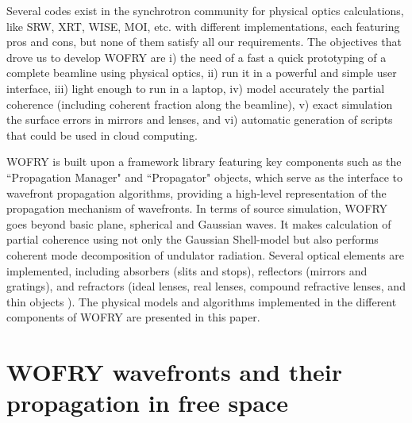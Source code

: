 \documentclass{iopconfser}
\begin{document}
Several codes exist in the synchrotron community for physical optics calculations, like SRW\cite{codeSRW}, XRT\cite{XRT}, WISE\cite{wise}, MOI\cite{MOI}, etc. with different implementations, each featuring pros and cons, but none of them satisfy all our requirements. The objectives that drove us to develop WOFRY are i) the need of a fast a quick prototyping of a complete beamline using physical optics, ii) run it in a powerful and simple user interface, iii) light enough to run in a laptop, iv) model accurately the partial coherence (including coherent fraction along the beamline), v) exact simulation the surface errors in mirrors and lenses, and vi) automatic generation of scripts that could be used in cloud computing.    

WOFRY is built upon a framework library \cite{syned} featuring key components such as the ``Propagation Manager" and ``Propagator" objects, which serve as the interface to wavefront propagation algorithms, providing a high-level representation of the propagation mechanism of wavefronts.
In terms of source simulation, WOFRY goes beyond basic plane, spherical and Gaussian waves. It makes calculation of partial coherence using not only the Gaussian Shell-model but also performs coherent mode decomposition of undulator radiation\cite{SanchezdelRio2022CMD}.
Several optical elements are implemented, including absorbers (slits and stops), reflectors (mirrors and gratings), and refractors (ideal lenses, real lenses, compound refractive lenses, and thin objects \cite{Celestre2019}). The physical models and algorithms implemented in the different components of WOFRY are presented in this paper. 







\section{WOFRY wavefronts and their propagation in free space}

\end{document}
